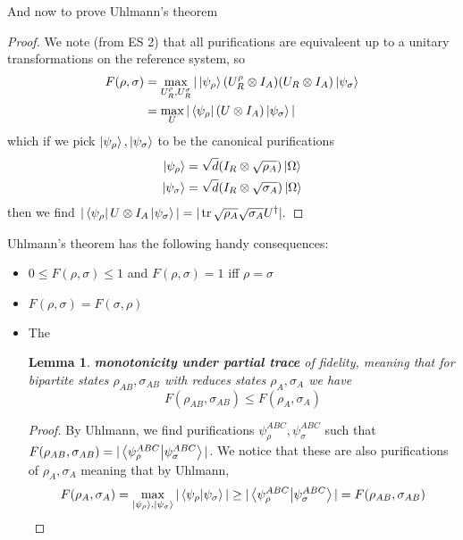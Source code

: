 \documentclass{article}
\newtheorem{lemma}{Lemma}
\theoremstyle{definition}
\begin{document}
And now to prove Uhlmann's theorem
\begin{proof}
  We note (from ES 2) that all purifications are equivaleent up to a unitary
  transformations on the reference system, so
  \begin{align*}
    F(\rho, \sigma)
    &= \max_{U_R^\rho, U_R^\sigma} | \ket{\psi_\rho} (U_R^\rho \otimes I_A)
    (U_R \otimes I_A) \ket{\psi_\sigma} \\
    &= \max_U |\bra{\psi_\rho} (U \otimes I_A) \ket{\psi_\sigma}|
  \end{align*}
  which if we pick $\ket{\psi_\rho}, \ket{\psi_\sigma}$ to be the canonical
  purifications
  \begin{align}
    \ket{\psi_\rho} &= \sqrt{d} (I_R \otimes \sqrt{\rho_A}) \ket{\Omega} \\
    \ket{\psi_\sigma} &= \sqrt{d} (I_R \otimes \sqrt{\sigma_A}) \ket{\Omega}
  \end{align}
  then we find $| \bra{\psi_\rho} U \otimes I_A \ket{\psi_\sigma} | = 
  | \tr \sqrt{\rho_A} \sqrt{\sigma_A} U^\dagger |.$ 
\end{proof}

Uhlmann's theorem has the following handy consequences:
\begin{itemize}
  \item $0 \leq F(\rho, \sigma) \leq 1$ and $F(\rho, \sigma) = 1$ iff 
    $\rho = \sigma$
  \item $F(\rho, \sigma) = F(\sigma, \rho)$
  \item The
    \begin{lemma}
      \textbf{monotonicity under partial trace} of fidelity, meaning that for
      bipartite states $\rho_{AB}, \sigma_{AB}$ with reduces states $\rho_A,
      \sigma_A$ we have
      \begin{equation}
        F(\rho_{AB}, \sigma_{AB}) \leq F(\rho_A, \sigma_A)
      \end{equation}
    \end{lemma}
    \begin{proof}
      By Uhlmann, we find purifications $\psi_\rho^{ABC}, \psi_\sigma^{ABC}$
      such that $F(\rho_{AB}, \sigma_{AB}) = |\bra{\psi_\rho^{ABC}}
      \ket{\psi_\sigma^{ABC}} |$. We notice that these are also purifications
      of $\rho_A, \sigma_A$ meaning that by Uhlmann, 
      \begin{equation}
        F(\rho_A, \sigma_A) = \max_{\ket{\psi_\rho}, \ket{\psi_\sigma}}
        |\bra{\psi_\rho} \ket{\psi_\sigma}| \geq |\bra{\psi_\rho^{ABC}}
        \ket{\psi_\sigma^{ABC}}| = F(\rho_{AB}, \sigma_{AB})
      \end{equation}
    \end{proof}
\end{itemize}
\end{document}
